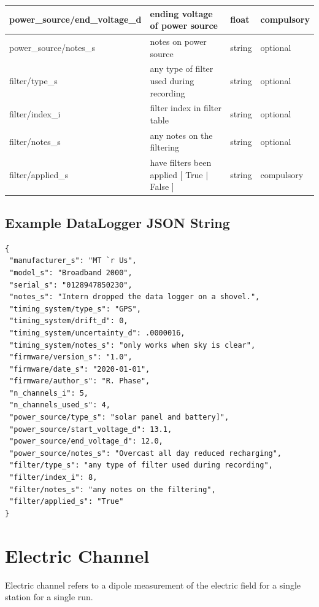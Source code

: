 \documentclass{article}
\begin{document}
\begin{table}[htb!]
\begin{tabular}{|l|p{3in}|l|l|}
		power\_source/end\_voltage\_d & ending voltage of power source & float & compulsory \\ \hline
		power\_source/notes\_s & notes on power source & string & optional \\ \hline
		filter/type\_s & any type of filter used during recording & string &  optional \\ \hline
		filter/index\_i & filter index in filter table & string &  optional \\ \hline
		filter/notes\_s & any notes on the filtering & string &  optional \\ \hline
		filter/applied\_s & have filters been applied [ True $|$ False ] & string & compulsory \\ \hline
	\end{tabular}
	\label{tab:datalogger}
\end{table}	

\newpage
\subsection{Example DataLogger JSON String}

\begin{verbatim}
{
 "manufacturer_s": "MT `r Us",
 "model_s": "Broadband 2000",
 "serial_s": "0128947850230",
 "notes_s": "Intern dropped the data logger on a shovel.",
 "timing_system/type_s": "GPS",
 "timing_system/drift_d": 0,
 "timing_system/uncertainty_d": .0000016,
 "timing_system/notes_s": "only works when sky is clear",
 "firmware/version_s": "1.0",
 "firmware/date_s": "2020-01-01",
 "firmware/author_s": "R. Phase",
 "n_channels_i": 5,
 "n_channels_used_s": 4,
 "power_source/type_s": "solar panel and battery]",
 "power_source/start_voltage_d": 13.1,
 "power_source/end_voltage_d": 12.0,
 "power_source/notes_s": "Overcast all day reduced recharging",
 "filter/type_s": "any type of filter used during recording",
 "filter/index_i": 8,
 "filter/notes_s": "any notes on the filtering",
 "filter/applied_s": "True"
}
\end{verbatim}

\newpage
\section{Electric Channel}

Electric channel refers to a dipole measurement of the electric field for a single station for a single run.
 
\end{document}
